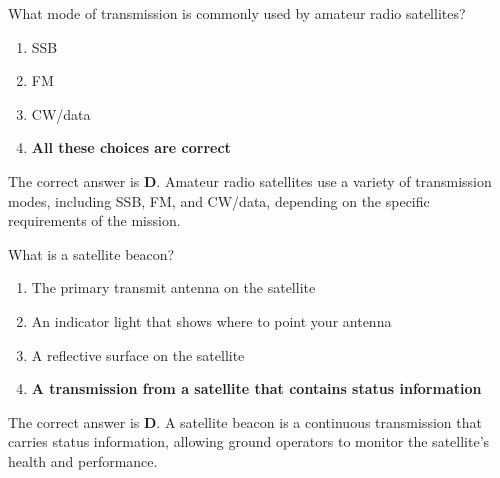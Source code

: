 \begin{tcolorbox}[colback=gray!10!white,colframe=black!75!black,title={T8B04}]
    What mode of transmission is commonly used by amateur radio satellites?
    \begin{enumerate}[label=\Alph*),noitemsep]
        \item SSB
        \item FM
        \item CW/data
        \item \textbf{All these choices are correct}
    \end{enumerate}
\end{tcolorbox}
The correct answer is \textbf{D}. Amateur radio satellites use a variety of transmission modes, including SSB, FM, and CW/data, depending on the specific requirements of the mission.

\begin{tcolorbox}[colback=gray!10!white,colframe=black!75!black,title={T8B05}]
    What is a satellite beacon?
    \begin{enumerate}[label=\Alph*),noitemsep]
        \item The primary transmit antenna on the satellite
        \item An indicator light that shows where to point your antenna
        \item A reflective surface on the satellite
        \item \textbf{A transmission from a satellite that contains status information}
    \end{enumerate}
\end{tcolorbox}
The correct answer is \textbf{D}. A satellite beacon is a continuous transmission that carries status information, allowing ground operators to monitor the satellite's health and performance.
